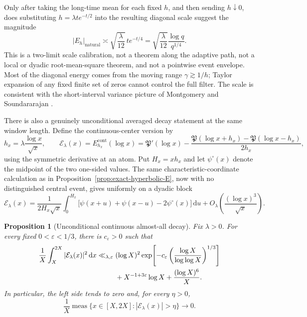 \documentclass[11pt,a4paper]{article}
\numberwithin{equation}{section}
\newtheorem{proposition}[theorem]{Proposition}
\theoremstyle{definition}
\newcommand{\dd}{\,\mathrm{d}}
\begin{document}
Only after taking the long-time mean for each fixed \(h\), and then sending
\(h\downarrow0\), does substituting \(h=\lambda t e^{-t/2}\) into the
resulting diagonal scale suggest the magnitude
\begin{equation}\label{eq:Eh-natural-adaptive-scale}
 |E_h|_{\mathrm{natural}}
 \asymp\sqrt{\frac\lambda{12}}\,t e^{-t/4}
 =\sqrt{\frac\lambda{12}}\frac{\log q}{q^{1/4}}.
\end{equation}
This is a two-limit scale calibration, not a theorem along the adaptive path,
not a local or dyadic root-mean-square theorem, and not a pointwise event
envelope.  Most of the diagonal energy comes from the moving range
\(\gamma\gtrsim1/h\); Taylor expansion of any fixed finite set of zeros
cannot control the full filter.  The scale is consistent with the
short-interval variance picture of Montgomery and Soundararajan
\cite{MontgomerySound2004}.

There is also a genuinely unconditional averaged decay statement at the
same window length.  Define the continuous-center version by
\begin{equation}\label{eq:continuous-adaptive-E}
 h_x=\lambda\frac{\log x}{\sqrt x},
 \qquad
 \mathcal E_\lambda(x)=E^{\mathrm{cont}}_{h_x}(\log x)
 =\mathfrak P'(\log x)
 -\frac{\mathfrak P(\log x+h_x)-\mathfrak P(\log x-h_x)}{2h_x},
\end{equation}
using the symmetric derivative at an atom.  Put \(H_x=xh_x\) and let
\(\psi^\circ(x)\) denote the midpoint of the two one-sided values.  The same
characteristic-coordinate calculation as in
Proposition~\ref{prop:exact-hyperbolic-E}, now with no distinguished central
event, gives uniformly on a dyadic block
\begin{equation}\label{eq:continuous-prime-side-transfer}
 \mathcal E_\lambda(x)
 =\frac{1}{2H_x\sqrt x}\int_0^{H_x}
 \bigl[\psi(x+u)+\psi(x-u)-2\psi^\circ(x)\bigr]\dd u
 +O_\lambda\!\left(\frac{(\log x)^3}{\sqrt x}\right).
\end{equation}

\begin{proposition}[Unconditional continuous almost-all decay]
\label{prop:almost-all-E-decay}
Fix \(\lambda>0\).  For every fixed \(0<\varepsilon<1/3\), there is
\(c_\varepsilon>0\) such that
\begin{align}
 \frac1X\int_X^{2X}|\mathcal E_\lambda(x)|^2\dd x
 \ll_{\lambda,\varepsilon}{}&
 (\log X)^2
 \exp\!\left[-c_\varepsilon
 \left(\frac{\log X}{\log\log X}\right)^{1/3}\right]
 \notag\\
 &+X^{-1+3\varepsilon}\log X
 +\frac{(\log X)^6}{X}.
 \label{eq:almost-all-E-L2}
\end{align}
In particular, the left side tends to zero and, for every \(\eta>0\),
\begin{equation}\label{eq:almost-all-E-measure}
 \frac1X\operatorname{meas}\{x\in[X,2X]:
 |\mathcal E_\lambda(x)|>\eta\}\longrightarrow0.
\end{equation}
\end{proposition}
\end{document}
